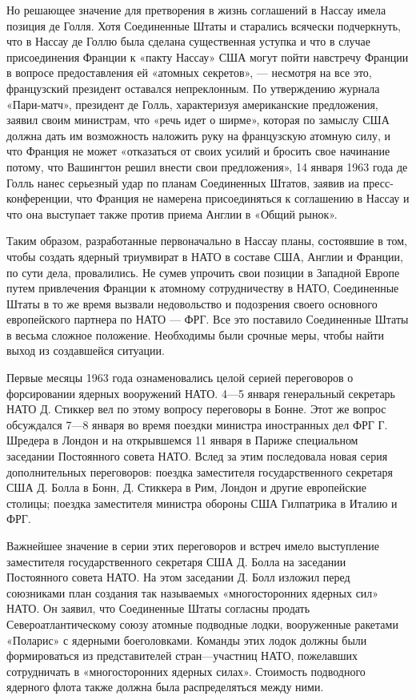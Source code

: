 \documentclass[12pt, a4paper, openany]{book}
\begin{document}
Но решающее значение для претворения в жизнь соглашений в Нассау имела позиция де Голля. Хотя Соединенные Штаты и старались всячески подчеркнуть, что в Нассау де Голлю была сделана существенная уступка и что в случае присоединения Франции к «пакту Нассау» США могут пойти навстречу Франции в вопросе предоставления ей «атомных секретов», — несмотря на все это, французский президент оставался непреклонным. По утверждению журнала «Пари-матч», президент де Голль, характеризуя американские предложения, заявил своим министрам, что «речь идет о ширме», которая по замыслу США должна дать им возможность наложить руку на французскую атомную силу, и что Франция не может «отказаться от своих усилий и бросить свое начинание потому, что Вашингтон решил внести свои предложения», 14 января 1963 года де Голль нанес серьезный удар по планам Соединенных Штатов, заявив иа пресс-конференции, что Франция не намерена присоединяться к соглашению в Нассау и что она выступает также против приема Англии в «Общий рынок».

Таким образом, разработанные первоначально в Нассау планы, состоявшие в том, чтобы создать ядерный триумвират в НАТО в составе США, Англии и Франции, по сути дела, провалились. Не сумев упрочить свои позиции в Западной Европе путем привлечения Франции к атомному сотрудничеству в НАТО, Соединенные Штаты в то же время вызвали недовольство и подозрения своего основного европейского партнера по НАТО — ФРГ. Все это поставило Соединенные Штаты в весьма сложное положение. Необходимы были срочные меры, чтобы найти выход из создавшейся ситуации.

Первые месяцы 1963 года ознаменовались целой серией переговоров о форсировании ядерных вооружений НАТО. 4—5 января генеральный секретарь НАТО Д. Стиккер вел по этому вопросу переговоры в Бонне. Этот же вопрос обсуждался 7—8 января во время поездки министра иностранных дел ФРГ Г. Шредера в Лондон и на открывшемся 11 января в Париже специальном заседании Постоянного совета НАТО. Вслед за этим последовала новая серия дополнительных переговоров: поездка заместителя государственного секретаря США Д. Болла в Бонн, Д. Стиккера в Рим, Лондон и другие европейские столицы; поездка заместителя министра обороны США Гилпатрика в Италию и ФРГ.

Важнейшее значение в серии этих переговоров и встреч имело выступление заместителя государственного секретаря США Д. Болла на заседании Постоянного совета НАТО. На этом заседании Д. Болл изложил перед союзниками план создания так называемых «многосторонних ядерных сил» НАТО. Он заявил, что Соединенные Штаты согласны продать Североатлантическому союзу атомные подводные лодки, вооруженные ракетами «Поларис» с ядерными боеголовками. Команды этих лодок должны были формироваться из представителей стран—участниц НАТО, пожелавших сотрудничать в «многосторонних ядерных силах». Стоимость подводного ядерного флота также должна была распределяться между ними.
\end{document}
